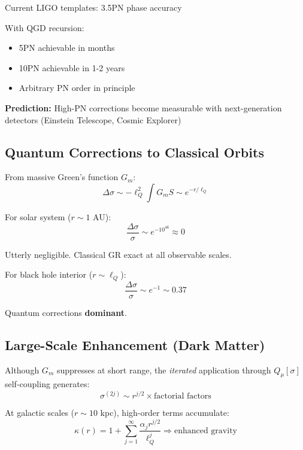 \documentclass[11pt,a4paper]{article}
\theoremstyle{definition}
\theoremstyle{remark}
\begin{document}
		Current LIGO templates: 3.5PN phase accuracy
		
		With QGD recursion:
		\begin{itemize}
			\item 5PN achievable in months
			\item 10PN achievable in 1-2 years
			\item Arbitrary PN order in principle
		\end{itemize}
		
		\textbf{Prediction:} High-PN corrections become measurable with next-generation detectors (Einstein Telescope, Cosmic Explorer)
		
		\subsection{Quantum Corrections to Classical Orbits}
		
		From massive Green's function $G_m$:
		\begin{equation}
			\Delta\sigma \sim -\ell_Q^2\int G_m S \sim e^{-r/\ell_Q}
		\end{equation}
		
		For solar system ($r \sim 1$ AU):
		\begin{equation}
			\frac{\Delta\sigma}{\sigma} \sim e^{-10^{46}} \approx 0
		\end{equation}
		
		Utterly negligible. Classical GR exact at all observable scales.
		
		For black hole interior ($r \sim \ell_Q$):
		\begin{equation}
			\frac{\Delta\sigma}{\sigma} \sim e^{-1} \sim 0.37
		\end{equation}
		
		Quantum corrections \textbf{dominant}.
		
		\subsection{Large-Scale Enhancement (Dark Matter)}
		
		Although $G_m$ suppresses at short range, the \emph{iterated} application through $Q_\mu[\sigma]$ self-coupling generates:
		\begin{equation}
			\sigma^{(2j)} \sim r^{j/2} \times \text{factorial factors}
		\end{equation}
		
		At galactic scales ($r \sim 10$ kpc), high-order terms accumulate:
		\begin{equation}
			\kappa(r) = 1 + \sum_{j=1}^\infty \frac{\alpha_j r^{j/2}}{\ell_Q^j} \Rightarrow \text{enhanced gravity}
		\end{equation}
		
\end{document}
